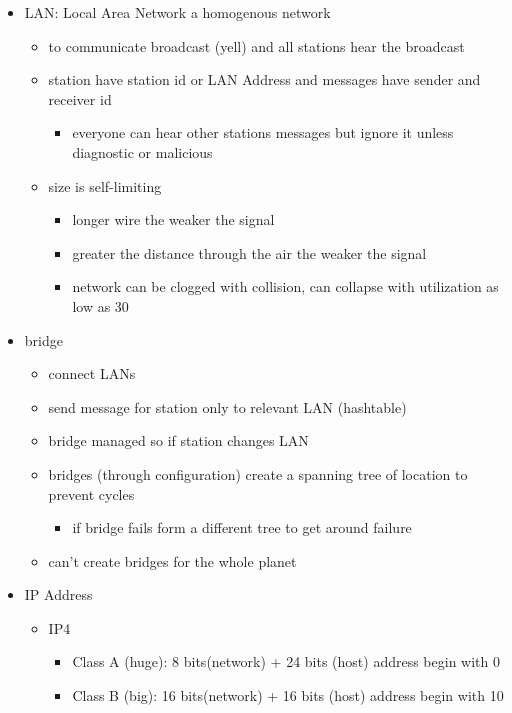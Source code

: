 \documentclass[11pt]{article}
\begin{document}
\begin{itemize}
  \item LAN:  Local Area Network a homogenous network
  \begin{itemize}
    \item to communicate broadcast (yell) and all stations hear the broadcast
    \item station have station id or LAN Address and messages have sender and receiver id
    \begin{itemize}
      \item everyone can hear other stations messages but ignore it unless diagnostic or malicious
    \end{itemize}
    \item size is self-limiting
    \begin{itemize}
      \item longer wire the weaker the signal
      \item greater the distance through the air the weaker the signal
      \item network can be clogged with collision, can collapse with utilization as low as 30%
    \end{itemize}
  \end{itemize}
  \item bridge
  \begin{itemize}
    \item connect LANs
    \item send message for station only to relevant LAN (hashtable)
    \item bridge managed so if station changes LAN
    \item bridges (through configuration) create a spanning tree of location to prevent cycles
    \begin{itemize}
      \item if bridge fails form a different tree to get around failure
    \end{itemize}
    \item can't create bridges for the whole planet
  \end{itemize}
  \item IP Address
  \begin{itemize}
    \item IP4
    \begin{itemize}
      \item Class A (huge): 8 bits(network) + 24 bits (host) address begin with 0
      \item Class B (big): 16 bits(network) + 16 bits (host) address begin with 10

\end{itemize}
\end{itemize}
\end{itemize}
\end{document}
